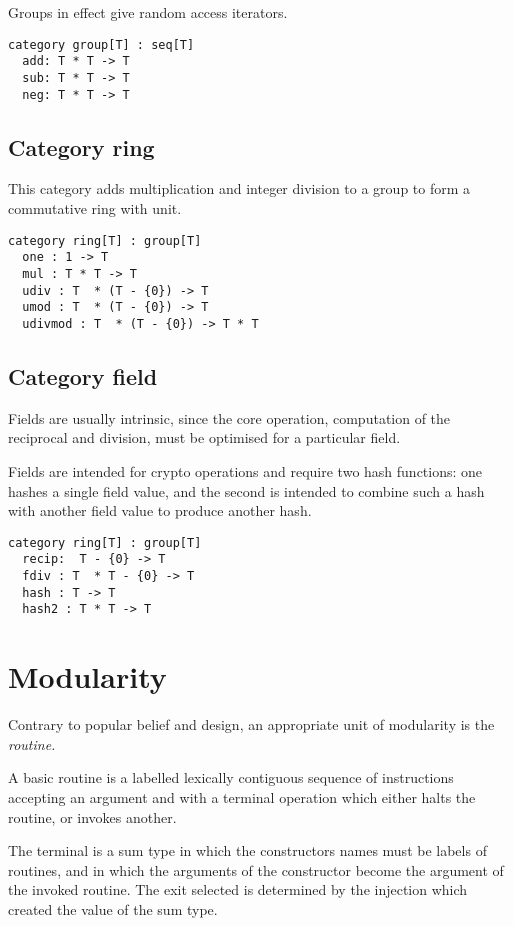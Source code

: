 \documentclass[oneside]{book}
\theoremstyle{plain}
\theoremstyle{definition}
\theoremstyle{plain}
\begin{document}
Groups in effect give random access iterators.

\begin{verbatim}
category group[T] : seq[T]
  add: T * T -> T
  sub: T * T -> T
  neg: T * T -> T
\end{verbatim}

\section{Category ring}
This category adds multiplication and integer division to a group
to form a commutative ring with unit.

\begin{verbatim}
category ring[T] : group[T]
  one : 1 -> T
  mul : T * T -> T
  udiv : T  * (T - {0}) -> T
  umod : T  * (T - {0}) -> T
  udivmod : T  * (T - {0}) -> T * T
\end{verbatim}

\section{Category field}
Fields are usually intrinsic, since the core operation, computation
of the reciprocal and division, must be optimised for a particular
field.

Fields are intended for crypto operations and require two hash functions:
one hashes a single field value, and the second is intended to combine 
such a hash with another field value to produce another hash.

\begin{verbatim}
category ring[T] : group[T]
  recip:  T - {0} -> T
  fdiv : T  * T - {0} -> T
  hash : T -> T
  hash2 : T * T -> T
\end{verbatim}


\chapter{Modularity}
Contrary to popular belief and design, an appropriate unit of modularity
is the {\em routine.}

A basic routine is a labelled lexically contiguous sequence of instructions
accepting an argument and with a terminal operation which either halts
the routine, or invokes another.

The terminal is a sum type in which the constructors names must be labels
of routines, and in which the arguments of the constructor become the
argument of the invoked routine.  The exit selected is determined by
the injection which created the value of the sum type.
\end{document}
